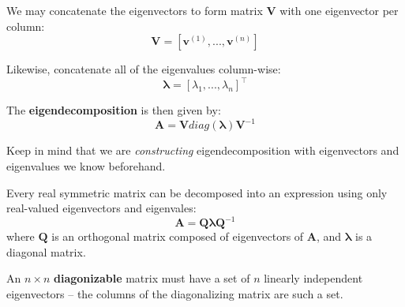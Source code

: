 \documentclass[11pt,twocolumn]{report}
\begin{document}
We may concatenate the eigenvectors to form matrix $\bm{V}$ with one
eigenvector per column: 
\begin{equation*}
  \bm{V} = [\bm{v}^{(1)},...,\bm{v}^{(n)}]
\end{equation*}

Likewise, concatenate all of the eigenvalues column-wise:
\begin{equation*}
  \bm{\lambda} = [\lambda_1,...,\lambda_n]^\intercal
\end{equation*}

The \textbf{eigendecomposition} is then given by:
\begin{equation}
  \bm{A} = \bm{V}diag(\bm{\lambda})\bm{V}^{-1}
\end{equation}

Keep in mind that we are \textit{constructing} eigendecomposition with
eigenvectors and eigenvalues we know beforehand.

Every real symmetric matrix can be decomposed into an expression using only
real-valued eigenvectors and eigenvales:
\begin{equation}
  \bm{A} = \bm{Q}\bm{\lambda}\bm{Q}^{-1}
\end{equation}
where $\bm{Q}$ is an orthogonal matrix composed of eigenvectors of $\bm{A}$,
and $\bm{\lambda}$ is a diagonal matrix.

An $n \times n$ \textbf{diagonizable} matrix must have a set of $n$ linearly
independent eigenvectors -- the columns of the diagonalizing matrix are such a
set.
\end{document}
